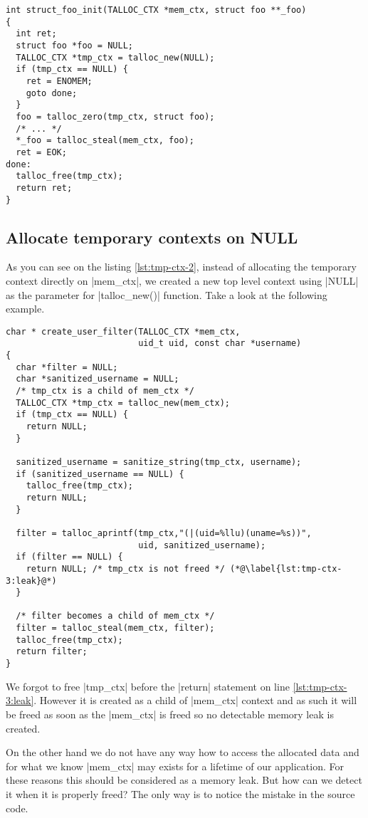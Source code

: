 \begin{lstlisting}[caption={Temporary context \#2},label=lst:tmp-ctx-2]
int struct_foo_init(TALLOC_CTX *mem_ctx, struct foo **_foo)
{
  int ret;
  struct foo *foo = NULL;
  TALLOC_CTX *tmp_ctx = talloc_new(NULL);
  if (tmp_ctx == NULL) {
    ret = ENOMEM;
    goto done;
  }
  foo = talloc_zero(tmp_ctx, struct foo);
  /* ... */
  *_foo = talloc_steal(mem_ctx, foo);
  ret = EOK;
done:
  talloc_free(tmp_ctx);
  return ret;
}
\end{lstlisting}

\subsection{Allocate temporary contexts on NULL}
\label{talloc:subsec:tmp-ctx-on-null}

As you can see on the listing \ref{lst:tmp-ctx-2}, instead of allocating the
temporary context directly on |mem_ctx|, we created a new top level context
using |NULL| as the parameter for |talloc_new()| function. Take a look at the
following example.

\begin{lstlisting}[caption={Temporary context \#3},label=lst:tmp-ctx-3]
char * create_user_filter(TALLOC_CTX *mem_ctx,
                          uid_t uid, const char *username)
{
  char *filter = NULL;
  char *sanitized_username = NULL;
  /* tmp_ctx is a child of mem_ctx */
  TALLOC_CTX *tmp_ctx = talloc_new(mem_ctx);
  if (tmp_ctx == NULL) {
    return NULL;
  }
  
  sanitized_username = sanitize_string(tmp_ctx, username);
  if (sanitized_username == NULL) {
    talloc_free(tmp_ctx);
    return NULL;
  }
  
  filter = talloc_aprintf(tmp_ctx,"(|(uid=%llu)(uname=%s))",
                          uid, sanitized_username);
  if (filter == NULL) {
    return NULL; /* tmp_ctx is not freed */ (*@\label{lst:tmp-ctx-3:leak}@*)
  }
  
  /* filter becomes a child of mem_ctx */
  filter = talloc_steal(mem_ctx, filter);
  talloc_free(tmp_ctx);
  return filter;
}
\end{lstlisting}

We forgot to free |tmp_ctx| before the |return| statement on line
\ref{lst:tmp-ctx-3:leak}. However it is created as a child of |mem_ctx| context
and as such it will be freed as soon as the |mem_ctx| is freed so no detectable
memory leak is created.

On the other hand we do not have any way how to access the allocated data
and for what we know |mem_ctx| may exists for a lifetime of our application.
For these reasons this should be considered as a memory leak. But how can we
detect it when it is properly freed? The only way is to notice the mistake in
the source code.

